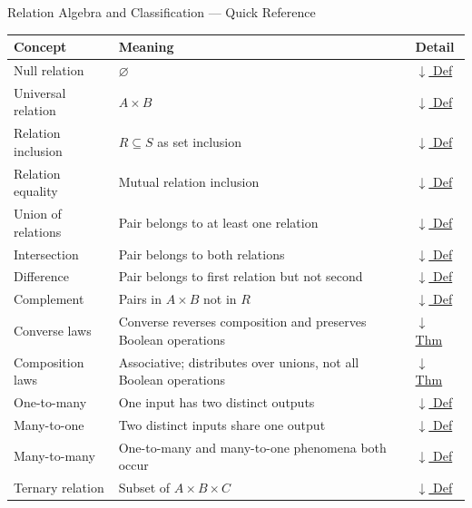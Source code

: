 \begin{toolkitbox}{Relation Algebra and Classification --- Quick Reference}
\small
\begin{tabular}{l l l}
\toprule
\textbf{Concept} & \textbf{Meaning} & \textbf{Detail} \\
\midrule
Null relation       & $\varnothing$                                               & \hyperref[def:null-relation]{$\downarrow$ Def} \\
Universal relation  & $A\times B$                                                 & \hyperref[def:universal-relation]{$\downarrow$ Def} \\
Relation inclusion  & $R\subseteq S$ as set inclusion                             & \hyperref[def:relation-inclusion]{$\downarrow$ Def} \\
Relation equality   & Mutual relation inclusion                                   & \hyperref[def:relation-equality]{$\downarrow$ Def} \\
Union of relations  & Pair belongs to at least one relation                       & \hyperref[def:relation-union]{$\downarrow$ Def} \\
Intersection        & Pair belongs to both relations                              & \hyperref[def:relation-intersection]{$\downarrow$ Def} \\
Difference          & Pair belongs to first relation but not second               & \hyperref[def:relation-difference]{$\downarrow$ Def} \\
Complement          & Pairs in $A\times B$ not in $R$                             & \hyperref[def:relation-complement]{$\downarrow$ Def} \\
Converse laws       & Converse reverses composition and preserves Boolean operations & \hyperref[thm:relation-converse-laws]{$\downarrow$ Thm} \\
Composition laws    & Associative; distributes over unions, not all Boolean operations & \hyperref[thm:relation-composition-boolean]{$\downarrow$ Thm} \\
One-to-many         & One input has two distinct outputs                          & \hyperref[def:one-to-many-relation]{$\downarrow$ Def} \\
Many-to-one         & Two distinct inputs share one output                        & \hyperref[def:many-to-one-relation]{$\downarrow$ Def} \\
Many-to-many        & One-to-many and many-to-one phenomena both occur            & \hyperref[def:many-to-many-relation]{$\downarrow$ Def} \\
Ternary relation    & Subset of $A\times B\times C$                               & \hyperref[def:many-place-relation]{$\downarrow$ Def} \\
\bottomrule
\end{tabular}
\end{toolkitbox}

